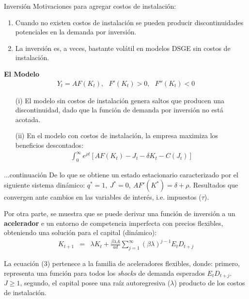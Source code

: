 \documentclass{beamer}
\begin{document}
\begin{frame}{Inversi\'on}
Motivaciones para agregar costos de instalaci\'on:
\begin{enumerate}
\item{Cuando no existen costos de instalaci\'on se pueden producir discontinuidades potenciales en la demanda por inversi\'on.}
\item{La inversi\'on es, a veces, bastante vol\'atil en modelos DSGE sin costos de instalaci\'on.}
\end{enumerate}

\textbf{El Modelo}
\begin{eqnarray*}
Y_{t}=AF(K_{t}),\ \ \ F'(K_{t})>0,\ \ \ F''(K_{t})<0
\end{eqnarray*}

\begin{enumerate}
\item[(i)]{El modelo sin costos de instalaci\'on genera saltos que producen una discontinuidad, dado que la funci\'on de demanda por inversi\'on no est\'a acotada.}
\item[(ii)]{En el modelo con costos de instalaci\'on, la empresa maximiza los beneficios descontados:}
\begin{eqnarray*}
\int_{0}^{\infty}e^{\rho t}[AF(K_{t})-J_{t}-\delta K_{t}-C(J_{t})]
\end{eqnarray*}
\end{enumerate}
\end{frame}

\begin{frame}{...continuaci\'on}
De lo que se obtiene un estado estacionario caracterizado por el siguiente sistema din\'amico: $q^{*}=1,\ J^{*}=0,\ AF'(K^{*})=\delta+\rho$. Resultados que convergen ante cambios en las variables de inter\'es, i.e. impuestos ($\tau$).

\medskip
Por otra parte, se muestra que se puede derivar una funci\'on de inversi\'on a un \textbf{acelerador} e un entorno de competencia imperfecta con precios flexibles, obteniendo una soluci\'on para el capital (din\'amico):
\begin{eqnarray}
K_{t+1} & = & \lambda K_{t}+\frac{\beta\lambda A}{ad}\sum_{j=1}^{\infty}(\beta\lambda)^{j-1}E_{t}D_{t+j}
\end{eqnarray}

La ecuaci\'on (3) pertenece a la familia de aceleradores flexibles, donde: primero, representa una funci\'on para todos los \emph{shocks} de demanda esperados $E_{t}D_{t+j}$. $J\geq 1$, segundo, el capital posee una ra\'iz autoregresiva ($\lambda$) producto de los costos de instalaci\'on.
\end{frame}
\end{document}
